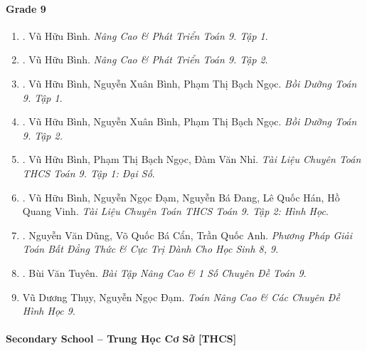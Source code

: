 \documentclass{article}
\begin{document}
\paragraph{Grade 9}

\begin{enumerate}
	\item \cite{Binh_Toan_9_tap_1}. Vũ Hữu Bình. {\it Nâng Cao \& Phát Triển Toán 9. Tập 1}.\hfill{\sf[done]}
	\item \cite{Binh_Toan_9_tap_2}. Vũ Hữu Bình. {\it Nâng Cao \& Phát Triển Toán 9. Tập 2}.\hfill{\sf[done]}
	\item \cite{Binh_boi_duong_Toan_9_tap_1}. Vũ Hữu Bình, Nguyễn Xuân Bình, Phạm Thị Bạch Ngọc. {\it Bồi Dưỡng Toán 9. Tập 1}.\hfill{\sf[done]}
	\item \cite{Binh_boi_duong_Toan_9_tap_2}. Vũ Hữu Bình, Nguyễn Xuân Bình, Phạm Thị Bạch Ngọc. {\it Bồi Dưỡng Toán 9. Tập 2.}\hfill{\sf[done]}
	\item \cite{TLCT_THCS_Toan_9_dai_so}. Vũ Hữu Bình, Phạm Thị Bạch Ngọc, Đàm Văn Nhỉ. {\it Tài Liệu Chuyên Toán THCS Toán 9. Tập 1: Đại Số}.\hfill{\sf[done]}
	\item \cite{TLCT_THCS_Toan_9_hinh_hoc}. Vũ Hữu Bình, Nguyễn Ngọc Đạm, Nguyễn Bá Đang, Lê Quốc Hán, Hồ Quang Vinh. {\it Tài Liệu Chuyên Toán THCS Toán 9. Tập 2: Hình Học}.\hfill{\sf[done]}
	\item \cite{Dung_Can_Anh_bdt_8_9}. Nguyễn Văn Dũng, Võ Quốc Bá Cẩn, Trần Quốc Anh. {\it Phương Pháp Giải Toán Bất Đẳng Thức \& Cực Trị Dành Cho Học Sinh 8, 9}.\hfill{\sf[reading]}
	\item \cite{Tuyen_Toan_9_old}. Bùi Văn Tuyên. {\it Bài Tập Nâng Cao \& 1 Số Chuyên Đề Toán 9}.\hfill{\sf[done]}
	\item Vũ Dương Thụy, Nguyễn Ngọc Đạm. {\it Toán Nâng Cao \& Các Chuyên Đề Hình Học 9}.
\end{enumerate}

\paragraph{Secondary School -- Trung Học Cơ Sở [THCS]}
\end{document}
